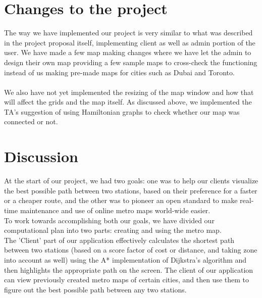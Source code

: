 \documentclass[fontsize=11pt]{article}
\begin{document}
    \section*{Changes to the project}
    The way we have implemented our project is very similar to what was described in the project proposal itself, implementing client as well as admin portion of the user. We have made a few map making changes where we have let the admin to design their own map providing a few sample maps to cross-check the functioning instead of us making pre-made maps for cities such as Dubai and Toronto.\\
    \\
    We also have not yet implemented the resizing of the map window and how that will affect the grids and the map itself. As discussed above, we implemented the TA's suggestion of using Hamiltonian graphs to check whether our map was connected or not.

    \section*{Discussion}
    At the start of our project, we had two goals: one was to help our clients visualize the best possible path between two stations, based on their preference for a faster or a cheaper route, and the other was to pioneer an open standard to make real-time maintenance and use of online metro maps world-wide easier. \\

    To work towards accomplishing both our goals, we have divided our computational plan into two parts: creating and using the metro map. \\

    The 'Client' part of our application effectively calculates the shortest path between two stations (based on a score factor of cost or distance, and taking zone into account as well) using the A* implementation of Dijkstra's algorithm and then highlights the appropriate path on the screen. The client of our application can view previously created metro maps of certain cities, and then use them to figure out the best possible path between any two stations.\\
\end{document}

